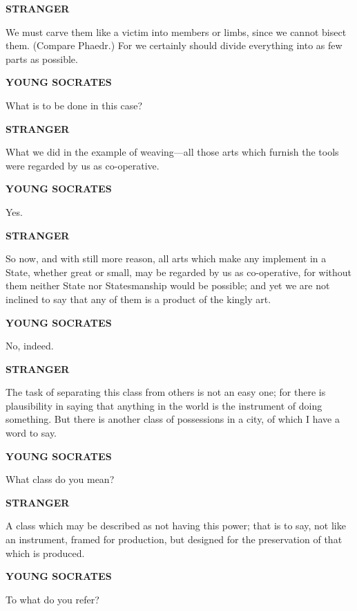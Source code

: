 \documentclass[11pt,letter]{article}
\begin{document}
\par \textbf{STRANGER}
\par   We must carve them like a victim into members or limbs, since we cannot bisect them. (Compare Phaedr.) For we certainly should divide everything into as few parts as possible.

\par \textbf{YOUNG SOCRATES}
\par   What is to be done in this case?

\par \textbf{STRANGER}
\par   What we did in the example of weaving—all those arts which furnish the tools were regarded by us as co-operative.

\par \textbf{YOUNG SOCRATES}
\par   Yes.

\par \textbf{STRANGER}
\par   So now, and with still more reason, all arts which make any implement in a State, whether great or small, may be regarded by us as co-operative, for without them neither State nor Statesmanship would be possible; and yet we are not inclined to say that any of them is a product of the kingly art.

\par \textbf{YOUNG SOCRATES}
\par   No, indeed.

\par \textbf{STRANGER}
\par   The task of separating this class from others is not an easy one; for there is plausibility in saying that anything in the world is the instrument of doing something. But there is another class of possessions in a city, of which I have a word to say.

\par \textbf{YOUNG SOCRATES}
\par   What class do you mean?

\par \textbf{STRANGER}
\par   A class which may be described as not having this power; that is to say, not like an instrument, framed for production, but designed for the preservation of that which is produced.

\par \textbf{YOUNG SOCRATES}
\par   To what do you refer?
\end{document}
